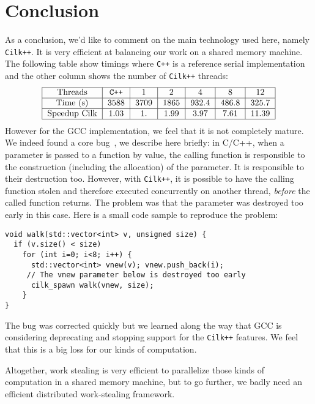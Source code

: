 \documentclass{deliverablereport}
\newcommand{\CilkP}{\texttt{Cilk++}\xspace}
\begin{document}
\section{Conclusion}

As a conclusion, we'd like to comment on the main technology used here, namely
\CilkP. It is very efficient at balancing our work on a shared memory
machine. The following table show timings where \verb|C++| is a reference serial
implementation and the other column shows the number of \CilkP threads:
\[\begin{tabular}{|c|c|c|c|c|c|c|}
\hline
 Threads & \texttt{C++} & 1 & 2 & 4 & 8 & 12 \\
 \hline
 Time (s) & 3588 & 3709 & 1865 & 932.4 & 486.8 & 325.7 \\
 \hline
 Speedup Cilk & 1.03 & 1. & 1.99 & 3.97 & 7.61 & 11.39 \\
 \hline
\end{tabular}
\]
However for the GCC implementation, we feel that it is not completely
mature. We indeed found a core bug~\cite{gcc-bug-80038}, we describe here
briefly: in C/C++, when a parameter is passed to a function by value, the
calling function is responsible to the construction (including the allocation)
of the parameter. It is responsible to their destruction too. However, with
\CilkP, it is possible to have the calling function stolen and therefore
executed concurrently on another thread, \emph{before} the called function
returns. The problem was that the parameter was destroyed too early in this
case. Here is a small code sample to reproduce the problem:
\begin{verbatim}
void walk(std::vector<int> v, unsigned size) {
  if (v.size() < size)
    for (int i=0; i<8; i++) {
      std::vector<int> vnew(v); vnew.push_back(i);
     // The vnew parameter below is destroyed too early
      cilk_spawn walk(vnew, size); 
    }
}
\end{verbatim}
The bug was corrected quickly but we learned along the way that GCC is
considering deprecating and stopping support for the \CilkP features. We feel
that this is a big loss for our kinds of computation.

Altogether, work stealing is very efficient to parallelize those kinds of
computation in a shared memory machine, but to go further, we badly need an
efficient distributed work-stealing framework.

\printbibliography
\end{document}
